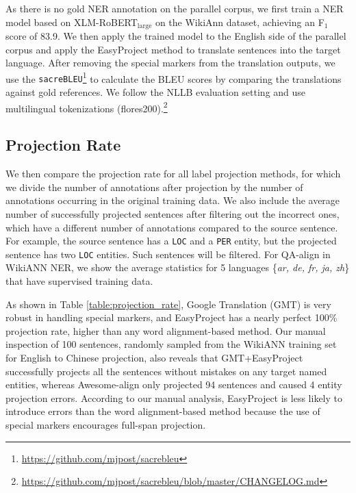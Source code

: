 \documentclass[11pt,dvipsnames]{article}
\begin{document}
As there is no gold NER annotation on the parallel corpus, we first train a NER model based on XLM-RoBERT$_{\text{large}}$  on the WikiAnn dataset, achieving an F$_1$ score of 83.9. We then apply the trained model to the English side of the parallel corpus and apply the EasyProject method to translate sentences into the target language.
After removing the special markers from the translation outputs, we use the {\tt sacreBLEU}\footnote{\url{https://github.com/mjpost/sacrebleu}} to calculate the BLEU scores by comparing the translations against gold references. We follow the NLLB evaluation setting and use  multilingual tokenizations (flores200).\footnote{\url{https://github.com/mjpost/sacrebleu/blob/master/CHANGELOG.md}}

\subsection{Projection Rate} 
\label{subsec:projection-rate-appendix}

We then compare the projection rate for all label projection methods, for which we divide the number of annotations after projection by the number of annotations occurring in the original training data.  We also include the average number of successfully projected sentences after filtering out the incorrect ones, which have a different number of annotations compared to the source sentence. For example, the source sentence has a {\tt LOC} and a {\tt PER} entity, but the projected sentence has two {\tt LOC} entities. Such sentences will be filtered.
For QA-align in WikiANN NER, we show the average statistics for 5 languages \{\textit{ar, de, fr, ja, zh}\} that have supervised training data.

As shown in Table \ref{table:projection_rate}, Google Translation (GMT) is very robust in handling special markers, and EasyProject has a nearly perfect 100\% projection rate, higher than any word alignment-based method. Our manual inspection of 100 sentences, randomly sampled from the WikiANN training set for English to Chinese projection, also reveals that GMT+EasyProject successfully projects all the sentences without mistakes on any target named entities, whereas Awesome-align only projected 94 sentences and caused 4 entity projection errors. 
According to our manual analysis, EasyProject is less likely to introduce errors than the word alignment-based method because the use of special markers encourages full-span projection. 
\end{document}
